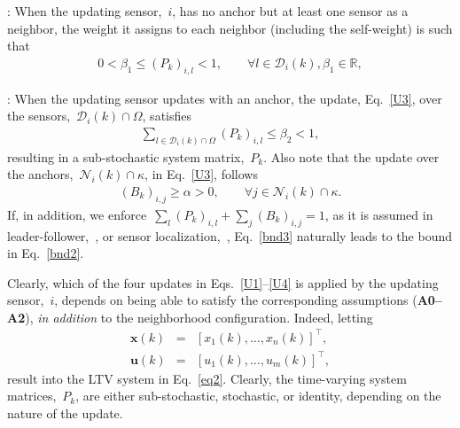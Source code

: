 \documentclass[draftclsnofoot, onecolumn, 12pt]{IEEEtran}
\def\mc{\mathcal}
\def\mb{\mathbf}
\def\mbb{\mathbb}
\begin{document}
: When the updating sensor,~$i$, has no anchor but at least one sensor as a neighbor, the weight it assigns to each neighbor (including the self-weight) is such that
\begin{eqnarray}\label{bnd1}
0 < \beta_1 \leq ({P}_{k})_{i,l} < 1,\qquad \forall l \in {\mathcal{D}}_i(k),\beta_1\in\mbb{R},
\end{eqnarray}

: When the updating sensor updates with an anchor, the update, Eq.~\eqref{U3}, over the sensors,~$\mc{D}_i(k)\cap\Omega$, satisfies
\begin{eqnarray}\label{bnd2}
\sum\limits_{l\in{\mc{D}_{i}(k)}\cap\Omega}({P}_{k})_{i,l} \leq\beta_2 < 1,
\end{eqnarray}
resulting in a sub-stochastic system matrix,~${P}_k$. Also note that the update over the anchors,~$\mc{N}_i(k)\cap\kappa$, in Eq.~\eqref{U3}, follows
\begin{eqnarray}\label{bnd3}
({B}_{k})_{i,j}\geq\alpha>0,\qquad\forall j\in\mc{N}_i(k)\cap\kappa.
\end{eqnarray}
If, in addition, we enforce~$\sum_l ({P}_{k})_{i,l}+\sum_j ({B}_{k})_{i,j}=1$, as it is assumed in leader-follower,~\cite{tanner02,4200874}, or sensor localization,~\cite{khan2009distributed,khan2010diland}, Eq.~\eqref{bnd3} naturally leads to the bound in Eq.~\eqref{bnd2}.

Clearly, which of the four updates in Eqs.~\eqref{U1}--\eqref{U4} is applied by the updating sensor,~$i$, depends on being able to satisfy the corresponding assumptions ({\bf A0--A2}), \emph{in addition} to the neighborhood configuration. Indeed, letting 
\begin{eqnarray*}
\mb{x}(k) &=& \left[x_1(k),\ldots,x_n(k)\right]^\top,\\
\mb{u}(k) &=& \left[u_1(k),\ldots,u_m(k)\right]^\top,
\end{eqnarray*} 
result into the LTV system in Eq.~\eqref{eq2}. Clearly, the time-varying system matrices,~${P}_k$, are either sub-stochastic, stochastic, or identity, depending on the nature of the update. 
\end{document}
